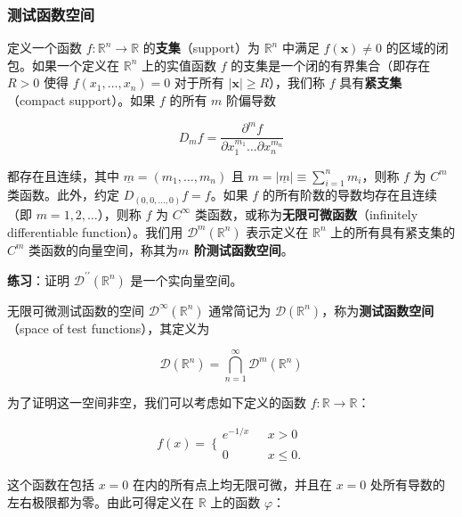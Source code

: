 \subsubsection{测试函数空间}\label{ux6d4bux8bd5ux51fdux6570ux7a7aux95f4}

定义一个函数 \(f:\mathbb{R}^{n} \rightarrow \mathbb{R}\)
的\textbf{支集}（support）为 \(\mathbb{R}^{n}\) 中满足
\(f\left( \mathbf{x} \right) \neq 0\) 的区域的闭包。如果一个定义在
\(\mathbb{R}^{n}\) 上的实值函数 \(f\) 的支集是一个闭的有界集合（即存在
\(R > 0\) 使得 \(f\left( x_{1},\ldots,x_{n} \right) = 0\) 对于所有
\(\left| \mathbf{x} \right| \geq R\)），我们称 \(f\)
具有\textbf{紧支集}（compact support）。如果 \(f\) 的所有 \(m\) 阶偏导数

\[D_{m}f = \frac{\partial^{m}f}{\partial x_{1}^{m_{1}}\ldots\partial x_{n}^{m_{n}}}\]

都存在且连续，其中 \(\underline{m} = \left( m_{1},\ldots,m_{n} \right)\)
且
\(m = \left| \underline{m} \right| \equiv \sum_{i = 1}^{n}m_{i}\)，则称
\(f\) 为 \(C^{m}\) 类函数。此外，约定 \(D_{(0,0,\ldots,0)}f = f\)。如果
\(f\) 的所有阶数的导数均存在且连续（即 \(m = 1,2,\ldots\)），则称 \(f\)
为 \(C^{\infty}\) 类函数，或称为\textbf{无限可微函数}（infinitely
differentiable function）。我们用
\(\mathcal{D}^{m}\left( \mathbb{R}^{n} \right)\) 表示定义在
\(\mathbb{R}^{n}\) 上的所有具有紧支集的 \(C^{m}\)
类函数的向量空间，称其为\textbf{\(m\) 阶测试函数空间}。

\textbf{练习}：证明
\(\mathcal{D}^{\prime\prime}\left( \mathbb{R}^{n} \right)\)
是一个实向量空间。

无限可微测试函数的空间
\(\mathcal{D}^{\infty}\left( \mathbb{R}^{n} \right)\) 通常简记为
\(\mathcal{D}\left( \mathbb{R}^{n} \right)\)，称为\textbf{测试函数空间}（space
of test functions），其定义为

\[\mathcal{D}\left( \mathbb{R}^{n} \right) = \bigcap_{n = 1}^{\infty}\mathcal{D}^{m}\left( \mathbb{R}^{n} \right)\]

为了证明这一空间非空，我们可以考虑如下定义的函数
\(f:\mathbb{R} \rightarrow \mathbb{R}\)：

\[f(x) = \left. \ \{\begin{array}{ll}
e^{- 1/x} & \text{     }x > 0 \\
 \\
0 & \text{     }x \leq 0.
\end{array} \right.\]

这个函数在包括 \(x = 0\) 在内的所有点上均无限可微，并且在 \(x = 0\)
处所有导数的左右极限都为零。由此可得定义在 \(\mathbb{R}\) 上的函数
\(\varphi\)：

